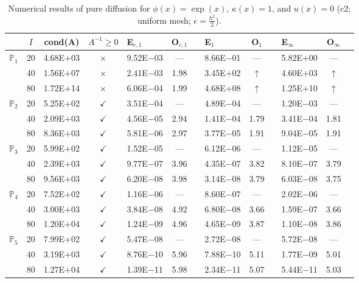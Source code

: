 \begin{table}[H]
\centering
\caption{Numerical results of pure diffusion for $\phi(x)=\exp(x)$, $\kappa(x)=1$, and $u(x)=0$ (c2; uniform mesh; $\epsilon=\frac{h^2}{2}$).}
\begin{tabular}{@{}l c c c l c c l c c l c c@{}}
\toprule
 & $I$ & cond(A) & $A^{-1}\geq 0$ &  E$_{c,1}$ & O$_{c,1}$ && E$_1$ & O$_1$ && E$_{\infty}$ & O$_{\infty}$\\
\midrule
\multirow{3}{*}{$\mathbb{P}_{1}$}
 & 20 & 4.68E$+$03 & $\times$ & 9.52E$-$03 & --- && 8.66E$-$01 & --- && 5.82E$+$00 & ---\\
 & 40 & 1.56E$+$07 & $\times$ & 2.41E$-$03 & 1.98 && 3.45E$+$02 & $\uparrow$ && 4.60E$+$03 & $\uparrow$\\
 & 80 & 1.72E$+$14 & $\times$ & 6.06E$-$04 & 1.99 && 4.68E$+$08 & $\uparrow$ && 1.25E$+$10 & $\uparrow$\\
\midrule
\multirow{3}{*}{$\mathbb{P}_{2}$}
 & 20 & 5.25E$+$02 & $\checkmark$ & 3.51E$-$04 & --- && 4.89E$-$04 & --- && 1.20E$-$03 & ---\\
 & 40 & 2.09E$+$03 & $\checkmark$ & 4.56E$-$05 & 2.94 && 1.41E$-$04 & 1.79 && 3.41E$-$04 & 1.81\\
 & 80 & 8.36E$+$03 & $\checkmark$ & 5.81E$-$06 & 2.97 && 3.77E$-$05 & 1.91 && 9.04E$-$05 & 1.91\\
\midrule
\multirow{3}{*}{$\mathbb{P}_{3}$}
 & 20 & 5.99E$+$02 & $\checkmark$ & 1.52E$-$05 & --- && 6.12E$-$06 & --- && 1.12E$-$05 & ---\\
 & 40 & 2.39E$+$03 & $\checkmark$ & 9.77E$-$07 & 3.96 && 4.35E$-$07 & 3.82 && 8.10E$-$07 & 3.79\\
 & 80 & 9.56E$+$03 & $\checkmark$ & 6.20E$-$08 & 3.98 && 3.14E$-$08 & 3.79 && 6.03E$-$08 & 3.75\\
\midrule
\multirow{3}{*}{$\mathbb{P}_{4}$}
 & 20 & 7.52E$+$02 & $\checkmark$ & 1.16E$-$06 & --- && 8.60E$-$07 & --- && 2.02E$-$06 & ---\\
 & 40 & 3.00E$+$03 & $\checkmark$ & 3.84E$-$08 & 4.92 && 6.80E$-$08 & 3.66 && 1.59E$-$07 & 3.66\\
 & 80 & 1.20E$+$04 & $\checkmark$ & 1.24E$-$09 & 4.96 && 4.65E$-$09 & 3.87 && 1.10E$-$08 & 3.86\\
\midrule
\multirow{3}{*}{$\mathbb{P}_{5}$}
 & 20 & 7.99E$+$02 & $\checkmark$ & 5.47E$-$08 & --- && 2.72E$-$08 & --- && 5.72E$-$08 & ---\\
 & 40 & 3.19E$+$03 & $\checkmark$ & 8.76E$-$10 & 5.96 && 7.88E$-$10 & 5.11 && 1.77E$-$09 & 5.01\\
 & 80 & 1.27E$+$04 & $\checkmark$ & 1.39E$-$11 & 5.98 && 2.34E$-$11 & 5.07 && 5.44E$-$11 & 5.03\\
\bottomrule
\end{tabular}
\end{table}